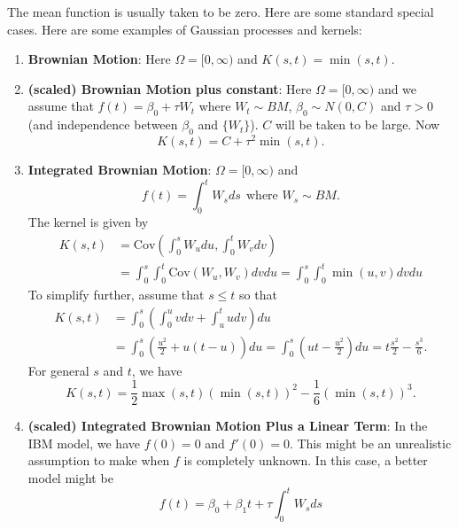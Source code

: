 \documentclass{scrartcl}
\begin{document}
The mean function is usually taken to be zero. Here are some standard
special cases.
Here are some examples of Gaussian processes and kernels:
\begin{enumerate}
\item \textbf{Brownian Motion}: Here $\Omega = [0, \infty)$ and $K(s,
  t) = \min(s, t)$.
\item \textbf{(scaled) Brownian Motion plus constant}: Here $\Omega =
  [0, 
  \infty)$ and we assume that $f(t) = \beta_0 + \tau W_t$ where $W_t
  \sim BM$, $\beta_0 \sim N(0, C)$ and $\tau > 0$ (and independence
  between   $\beta_0$ and $\{W_t\}$). $C$ will be taken to be
  large. Now  
  \begin{equation*}
    K(s, t) = C + \tau^2 \min(s, t). 
  \end{equation*}
\item \textbf{Integrated Brownian Motion}: $\Omega = [0,
  \infty)$ and
  \begin{equation*}
    f(t) = \int_0^t W_s ds ~~ \text{where $W_s \sim BM$}. 
  \end{equation*}
  The kernel is given by
  \begin{align*}
    K(s, t) &= \text{Cov} \left(\int_0^s W_u du, \int_0^t W_v dv
              \right) \\
            &= \int_0^s \int_0^t \text{Cov}(W_u, W_v) dv du 
            = \int_0^s \int_0^t \min(u, v) dv du
  \end{align*}
  To simplify further, assume that $s \leq t$ so that
  \begin{align*}
K(s, t)            &= \int_0^s \left(\int_0^u v dv + \int_u^t u dv \right) du
    \\
            &= \int_0^s \left(\frac{u^2}{2} + u(t - u) \right) du = \int_0^s \left(ut - \frac{u^2}{2} \right) du = t \frac{s^2}{2}
      - \frac{s^3}{6}. 
  \end{align*}
  For general $s$ and $t$, we have
  \begin{equation*}
    K(s, t) = \frac{1}{2} \max(s, t) \left(\min(s, t)\right)^2 -
    \frac{1}{6} \left(\min(s, t) \right)^3. 
  \end{equation*}
\item \textbf{(scaled) Integrated Brownian Motion Plus a Linear Term}:
  In the 
  IBM model, we have $f(0) = 0$ and $f'(0) = 0$. This might be
  an unrealistic assumption to make when $f$ is completely
  unknown. In this case, a better model might be
  \begin{equation*}
    f(t) = \beta_0 + \beta_1 t + \tau \int_0^t W_s ds
  \end{equation*}

\end{enumerate}
\end{document}
